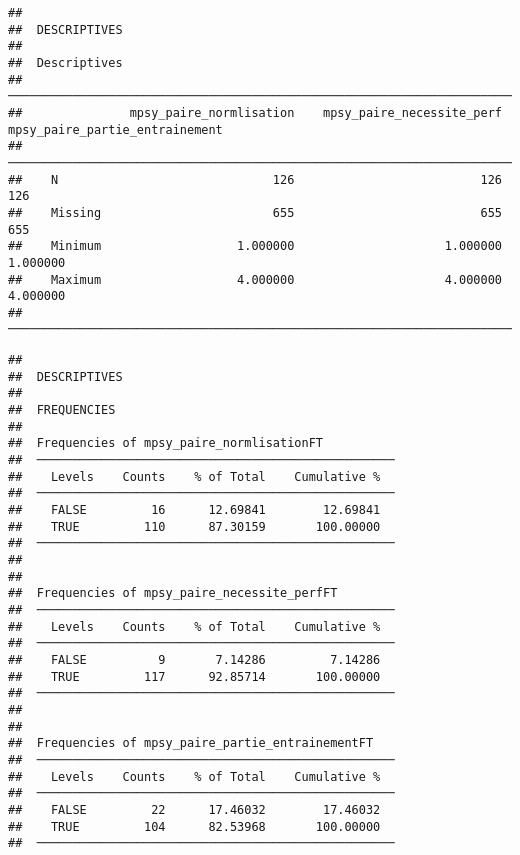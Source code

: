 \documentclass[
]{article}
\begin{document}
\begin{verbatim}
## 
##  DESCRIPTIVES
## 
##  Descriptives                                                                                          
##  ───────────────────────────────────────────────────────────────────────────────────────────────────── 
##               mpsy_paire_normlisation    mpsy_paire_necessite_perf    mpsy_paire_partie_entrainement   
##  ───────────────────────────────────────────────────────────────────────────────────────────────────── 
##    N                              126                          126                               126   
##    Missing                        655                          655                               655   
##    Minimum                   1.000000                     1.000000                          1.000000   
##    Maximum                   4.000000                     4.000000                          4.000000   
##  ─────────────────────────────────────────────────────────────────────────────────────────────────────
\end{verbatim}

\begin{verbatim}
## 
##  DESCRIPTIVES
## 
##  FREQUENCIES
## 
##  Frequencies of mpsy_paire_normlisationFT           
##  ────────────────────────────────────────────────── 
##    Levels    Counts    % of Total    Cumulative %   
##  ────────────────────────────────────────────────── 
##    FALSE         16      12.69841        12.69841   
##    TRUE         110      87.30159       100.00000   
##  ────────────────────────────────────────────────── 
## 
## 
##  Frequencies of mpsy_paire_necessite_perfFT         
##  ────────────────────────────────────────────────── 
##    Levels    Counts    % of Total    Cumulative %   
##  ────────────────────────────────────────────────── 
##    FALSE          9       7.14286         7.14286   
##    TRUE         117      92.85714       100.00000   
##  ────────────────────────────────────────────────── 
## 
## 
##  Frequencies of mpsy_paire_partie_entrainementFT    
##  ────────────────────────────────────────────────── 
##    Levels    Counts    % of Total    Cumulative %   
##  ────────────────────────────────────────────────── 
##    FALSE         22      17.46032        17.46032   
##    TRUE         104      82.53968       100.00000   
##  ──────────────────────────────────────────────────
\end{verbatim}
\end{document}
